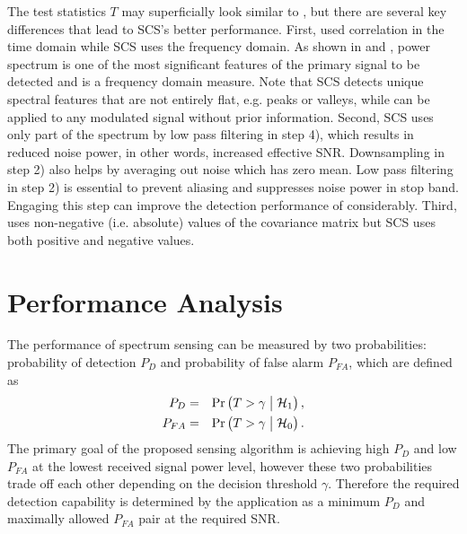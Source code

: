\documentclass[draftclsnofoot,onecolumn,12pt]{IEEEtran}
\begin{document}
The test statistics $T$ may superficially look similar to \cite{ZenLia09}, but there are several key differences that lead to SCS's better performance. 
First, \cite{ZenLia09} used correlation in the time domain while SCS uses the frequency domain.
As shown in \cite{CorGho07} and  \cite{HanSho06}, power spectrum is one of the most significant features of the primary signal to be detected and is a frequency domain measure. Note that SCS detects unique spectral features that are not entirely flat, e.g. peaks or valleys, while \cite{ZenLia09} can be applied to any modulated signal without prior information.
Second, SCS uses only part of the spectrum by low pass filtering in step 4), which results in reduced noise power, in other words, increased effective SNR. Downsampling in step 2) also helps by averaging out noise which has zero mean. Low pass filtering in step 2) is essential to prevent aliasing and suppresses noise power in stop band. Engaging this step can improve the detection performance of \cite{ZenLia09} considerably.
Third, \cite{ZenLia09} uses non-negative (i.e. absolute) values of the covariance matrix but SCS uses both positive and negative values. 

\section{Performance Analysis}
\label{sec:SCSAnalysis}

The performance of spectrum sensing can be measured by two probabilities: probability of detection $P_D$ and probability of false alarm $P_{FA}$, which are defined as
\begin{eqnarray}
    P_D &=& \Pr \left(T > \gamma \bigm| \mathcal{H}_1 \right), \label{eq:PD_def}\\
    P_{FA} &=& \Pr \left(T > \gamma \bigm| \mathcal{H}_0 \right).  \label{eq:PFA_def}
\end{eqnarray}
The primary goal of the proposed sensing algorithm is achieving high $P_D$ and low $P_{FA}$ at the lowest received signal power level,
however these two probabilities trade off each other depending on the decision threshold $\gamma$.
Therefore the required detection capability is determined by the application as a minimum $P_D$ and maximally allowed $P_{FA}$ pair at the required SNR.
\end{document}
